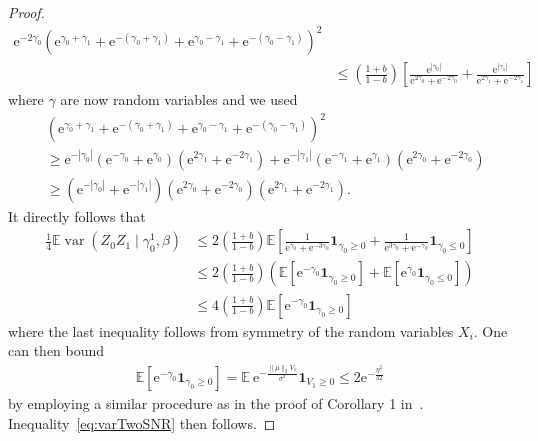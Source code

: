 \documentclass[twoside,11pt]{article}
\DeclareMathOperator{\var}{var}
\newcommand{\Indi}{\mathbf{1}}
\def\EE{ \mathbb{E} }
\def\E{ \mathrm{e} }							%
\newcommand{\mixcoefbound}{\ensuremath{b}}
\newcommand{\paramobs}{\mu}
\newcommand{\paramtrans}{\beta}
\newcommand{\paramgamma}{\gamma}
\begin{document}
\begin{proof}
\begin{align*}
{  \E^{-2\paramgamma_0}}{(\E^{\paramgamma_0 + \paramgamma_1}+
  \E^{-(\paramgamma_0+ \paramgamma_1)}+\E^{\paramgamma_0-
    \paramgamma_1}+ \E^{-(\paramgamma_0-\paramgamma_1)})^2}\\
%
&\leq \left( \frac{1 + \mixcoefbound}{1 - \mixcoefbound}\right) \left[
  \frac{\E^{|\paramgamma_0|}}{\E^{2\paramgamma_0} +
    \E^{-2\paramgamma_0}} +
  \frac{\E^{|\paramgamma_1|}}{\E^{2\paramgamma_1} +
    \E^{-2\paramgamma_1}}\right]
\end{align*}
where $\paramgamma$ are now random variables and we used
\begin{align*}
&(\E^{\paramgamma_0 + \paramgamma_1}+ \E^{-(\paramgamma_0+
    \paramgamma_1)}+\E^{\paramgamma_0- \paramgamma_1}+
  \E^{-(\paramgamma_0-\paramgamma_1)})^2 \\
%
& \geq \E^{-|\paramgamma_0|}(\E^{-\paramgamma_0} +
  \E^{\paramgamma_0})(\E^{2\paramgamma_1}+ \E^{-2\paramgamma_1}) +
  \E^{-|\paramgamma_1|}(\E^{-\paramgamma_1} +
  \E^{\paramgamma_1})(\E^{2\paramgamma_0}+ \E^{-2\paramgamma_0})\\
%
& \geq (\E^{-|\paramgamma_0|} +
  \E^{-|\paramgamma_1|})(\E^{2\paramgamma_0}+
  \E^{-2\paramgamma_0})(\E^{2\paramgamma_1}+ \E^{-2\paramgamma_1}).
\end{align*}
It directly follows that
\begin{align*}
\frac{1}{4} \EE \var(Z_0 Z_1 \mid \paramgamma_0^1,\paramtrans) &\leq 2
\left( \frac{1 + \mixcoefbound}{1 - \mixcoefbound}\right) \EE\left[
  \frac{1}{\E^{\paramgamma_0} + \E^{-3 \paramgamma_0}}
  \Indi_{\paramgamma_0\geq 0} +\frac{1}{\E^{3\paramgamma_0 } +
    \E^{-\paramgamma_0}} \Indi_{\paramgamma_0 \leq 0} \right] \\
%
& \leq 2 \left( \frac{1 + \mixcoefbound}{1 - \mixcoefbound}\right)
(\EE [\E^{-\paramgamma_0} \Indi_{\paramgamma_0\geq 0}] + \EE
     [\E^{\paramgamma_0}\Indi_{\paramgamma_0\leq 0}]) \\
%
& \leq 4 \left( \frac{1 + \mixcoefbound}{1 - \mixcoefbound} \right)
     \EE [\E^{-\paramgamma_0} \Indi_{\paramgamma_0\geq 0}]
\end{align*}
where the last inequality follows from symmetry of the random
variables $X_i$.  One can then bound
\begin{align*}
\EE [\E^{-\paramgamma_0} \Indi_{\paramgamma_0\geq 0}] = \EE \:
\E^{-\frac{\|\paramobs\|_2 V_1}{\sigma^2}}\Indi_{V_1 \geq 0} \leq 2
\E^{-\frac{\eta^2}{32}}
\end{align*}
by employing a similar procedure as in the proof of Corollary 1
in~\cite{BalWaiYu14}. Inequality~\eqref{eq:varTwoSNR} then follows.
\end{proof}
\end{document}
